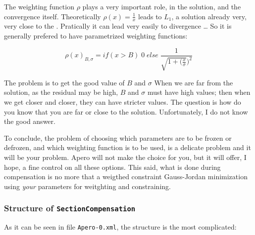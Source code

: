 The weighting function $\rho$ plays  a very important role, in the solution, and the
convergence itself.  Theoretically $\rho(x)=\frac1x$  leads to $L_1$, a solution already very,
very close to the . %
Pratically it can lead very easily to divergence \dots
So it is generally prefered to have parametrized weighting functions:


\begin{equation}
   \label{EQ:L1:SEC}
   \rho(x)_{B,\sigma} = if (x>B) \; 0 \; else \;  \frac1{\sqrt{1+(\frac{x}\sigma})^2}
\end{equation}


The problem is to get the good value of $B$ and $\sigma$  When we are far from
the solution, as the residual may be high, $B$ and  $\sigma$ must have high values;
then when we get closer and closer, they can have stricter values. The question
is how do you know that you are far or close to the solution. Unfortunately,
I do not know the good answer.

To conclude, the problem of choosing which parameters are to be frozen or
defrozen, and which weighting function is to be used, is a delicate problem
and it will be your problem. Apero will not make the choice for you, but
it will offer, I hope, a fine control on all these options.
This said, what is done during compensation is no more that a weigthed
constraint Gauss-Jordan minimization using \emph{your} parameters for
weitghting and constraining.



\subsubsection{Structure of {\tt SectionCompensation}}

As it can be seen in  file {\tt Apero-0.xml}, the structure is 
the most complicated:

